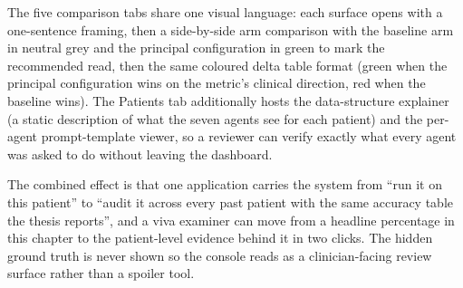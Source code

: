 The five comparison tabs share one visual language: each surface opens
with a one-sentence framing, then a side-by-side arm comparison with the
baseline arm in neutral grey and the principal configuration in green to
mark the recommended read, then the same coloured delta table format
(green when the principal configuration wins on the metric's clinical
direction, red when the baseline wins). The Patients tab additionally
hosts the data-structure explainer (a static description of what the
seven agents see for each patient) and the per-agent prompt-template
viewer, so a reviewer can verify exactly what every agent was asked to do
without leaving the dashboard.

The combined effect is that one application carries the system from
``run it on this patient'' to ``audit it across every past patient with
the same accuracy table the thesis reports'', and a viva examiner can
move from a headline percentage in this chapter to the patient-level
evidence behind it in two clicks. The hidden ground truth is never
shown so the console reads as a clinician-facing review surface rather
than a spoiler tool.

